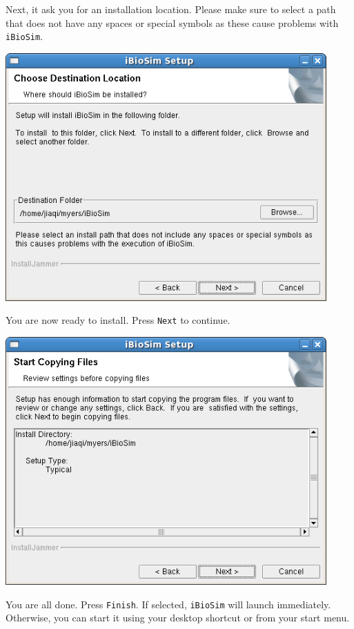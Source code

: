 \documentclass[titlepage,11pt]{article}
\begin{document}
Next, it ask you for an installation location.  Please make sure to
select a path that does not have any spaces or special symbols as
these cause problems with {\tt iBioSim}.

\includegraphics[height=95mm]{screenshots/location}

You are now ready to install.  Press {\tt Next} to continue.

\includegraphics[height=95mm]{screenshots/confirm}

You are all done.  Press {\tt Finish}.  If selected, {\tt iBioSim}
will launch immediately.  Otherwise, you can start it using your
desktop shortcut or from your start menu.
\end{document}
